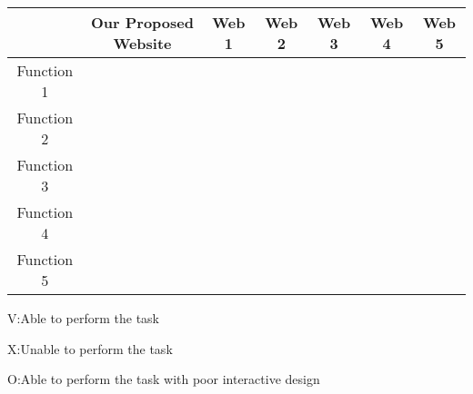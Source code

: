 \documentclass{article}
\begin{document}
\begin{table}[h!]
    \centering
    \begin{tabular}{|c|c|c|c|c|c|c|}
    \hline
                   &  Our Proposed Website & Web 1 & Web 2 & Web 3 & Web 4 & Web 5 \\
    \hline
    Function 1    &            &       &       &       &       &              \\
    \hline
    Function 2    &            &       &       &       &       &              \\
    \hline
    Function 3    &            &       &       &       &       &             \\
    \hline
    Function 4    &            &       &       &       &       &              \\
    \hline
    Function 5    &            &       &       &       &       &              \\ 
    \hline
    \end{tabular}
\end{table}
V:Able to perform the task\par
X:Unable to perform the task\par
O:Able to perform the task with poor interactive design\par
\end{document}
